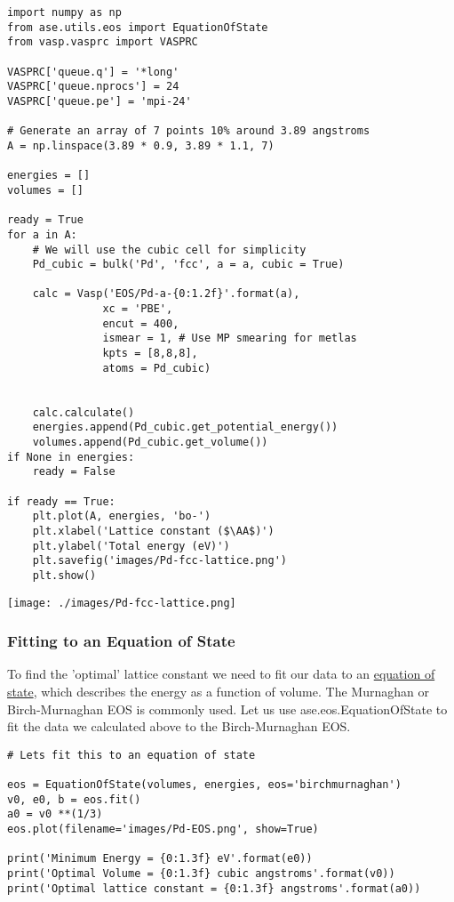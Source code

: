 \documentclass[11pt]{article}
\begin{document}
\begin{verbatim}
import numpy as np
from ase.utils.eos import EquationOfState
from vasp.vasprc import VASPRC

VASPRC['queue.q'] = '*long'
VASPRC['queue.nprocs'] = 24
VASPRC['queue.pe'] = 'mpi-24'

# Generate an array of 7 points 10% around 3.89 angstroms
A = np.linspace(3.89 * 0.9, 3.89 * 1.1, 7)

energies = []
volumes = []

ready = True
for a in A: 
    # We will use the cubic cell for simplicity
    Pd_cubic = bulk('Pd', 'fcc', a = a, cubic = True)
    
    calc = Vasp('EOS/Pd-a-{0:1.2f}'.format(a),
               xc = 'PBE',
               encut = 400,
               ismear = 1, # Use MP smearing for metlas
               kpts = [8,8,8],
               atoms = Pd_cubic)
    

    calc.calculate()
    energies.append(Pd_cubic.get_potential_energy())
    volumes.append(Pd_cubic.get_volume())
if None in energies:
    ready = False
    
if ready == True:
    plt.plot(A, energies, 'bo-')
    plt.xlabel('Lattice constant ($\AA$)')
    plt.ylabel('Total energy (eV)')
    plt.savefig('images/Pd-fcc-lattice.png')
    plt.show()
\end{verbatim}

\begin{center}
\texttt{[image: ./images/Pd-fcc-lattice.png]}
\end{center}


\subsubsection{Fitting to an Equation of State}
\label{sec:org5d39fc3}

To find the 'optimal' lattice constant we need to fit our data to an \href{https://wiki.fysik.dtu.dk/ase/tutorials/eos/eos.html?highlight=equation\%20state}{equation of state}, which describes the energy as a function of volume. The Murnaghan or Birch-Murnaghan EOS is commonly used. Let us use ase.eos.EquationOfState to fit the data we calculated above to the Birch-Murnaghan EOS.

\begin{verbatim}
# Lets fit this to an equation of state

eos = EquationOfState(volumes, energies, eos='birchmurnaghan')
v0, e0, b = eos.fit()
a0 = v0 **(1/3)
eos.plot(filename='images/Pd-EOS.png', show=True)

print('Minimum Energy = {0:1.3f} eV'.format(e0))
print('Optimal Volume = {0:1.3f} cubic angstroms'.format(v0))
print('Optimal lattice constant = {0:1.3f} angstroms'.format(a0))
\end{verbatim}
\end{document}
